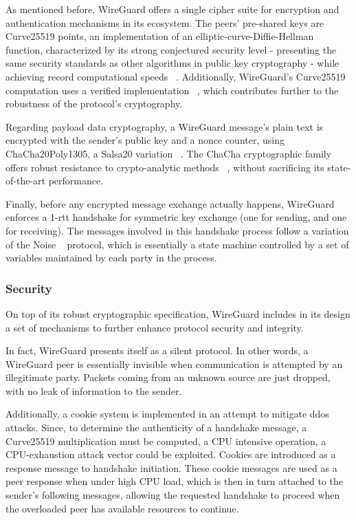 \documentclass[11pt,twoside,a4paper]{report}
\begin{document}
As mentioned before, WireGuard offers a single cipher suite for encryption and authentication mechanisms in its ecosystem. The peers' pre-shared keys are Curve25519 points, an implementation of an elliptic-curve-Diffie-Hellman function, characterized by its strong conjectured security level - presenting the same security standards as other algorithms in public key cryptography - while achieving record computational speeds ~\cite{bernstein2006curve25519}. Additionally, WireGuard's Curve25519 computation uses a verified implementation ~\cite{zinzindohoue2017hacl}, which contributes further to the robustness of the protocol's cryptography.

Regarding payload data cryptography, a WireGuard message's plain text is encrypted with the sender's public key and a nonce counter, using ChaCha20Poly1305, a Salsa20 variation ~\cite{bernstein2008chacha}. The ChaCha cryptographic family offers robust resistance to crypto-analytic methods ~\cite{cryptoeprint:2014/613}, without sacrificing its state-of-the-art performance.

Finally, before any encrypted message exchange actually happens, WireGuard enforces a 1-\ac{rtt} handshake for symmetric key exchange (one for sending, and one for receiving). The messages involved in this handshake process follow a variation of the Noise ~\cite{perrin2018noise} protocol, which is essentially a state machine controlled by a set of variables maintained by each party in the process.

\subsubsection{Security}

On top of its robust cryptographic specification, WireGuard includes in its design a set of mechanisms to further enhance protocol security and integrity.

In fact, WireGuard presents itself as a silent protocol. In other words, a WireGuard peer is essentially invisible when communication is attempted by an illegitimate party. Packets coming from an unknown source are just dropped, with no leak of information to the sender.

Additionally, a cookie system is implemented in an attempt to mitigate \ac{ddos} attacks. Since, to determine the authenticity of a handshake message, a Curve25519 multiplication must be computed, a CPU intensive operation, a CPU-exhaustion attack vector could be exploited. Cookies are introduced as a response message to handshake initiation. These cookie messages are used as a peer response when under high CPU load, which is then in turn attached to the sender's following messages, allowing the requested handshake to proceed when the overloaded peer has available resources to continue.
\end{document}
